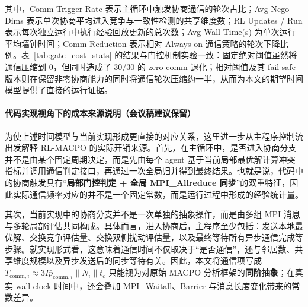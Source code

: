 \documentclass[12pt]{ctexart}
\begin{document}
\begin{table}[htbp]
  \centering
  \caption{Measured Cost Statistics for the Gate Mechanism Study (F1/F2/F5, 10 runs per function)}
  \label{tab:gate_cost_stats}
  \end{table}

  其中，Comm Trigger Rate 表示主循环中触发协商通信的轮次占比；Avg Nego Dims 表示单次协商平均进入竞争与一致性检测的共享维度数；RL Updates / Run 表示每次独立运行中执行经验回放更新的总次数；Avg Wall Time(s) 为单次运行平均墙钟时间；Comm Reduction 表示相对 Always-on 通信策略的轮次下降比例。表~\ref{tab:gate_cost_stats} 的结果与门控机制实验一致：固定绝对阈值虽然将通信压缩到 0，但同时造成了 \(30/30\) 的 zero-comm 退化；相对阈值及其 fail-safe 版本则在保留非零协商能力的同时将通信轮次压缩约一半，从而为本文的期望时间模型提供了直接的运行证据。


\paragraph{代码实现视角下的成本来源说明（会议稿建议保留）}
为使上述时间模型与当前实现形成更直接的对应关系，这里进一步从主程序控制流出发解释 RL-MACPO 的实际开销来源。首先，在主循环中，是否进入协商分支并不是由某个固定周期决定，而是先由每个 agent 基于当前局部最优解计算冲突指标并调用通信判定接口，再通过一次全局归并得到最终结果。也就是说，代码中的协商触发具有“\textbf{局部门控判定 + 全局 MPI\_Allreduce 同步}”的双重特征，因此实际通信频率对应的并不是一个固定常数，而是运行过程中形成的经验统计量。

其次，当前实现中的协商分支并不是一次单独的抽象操作，而是由多组 MPI 消息与多轮局部评估共同构成。具体而言，进入协商后，主程序至少包括：发送本地最优解、交换竞争评估量、交换双侧扰动评估量，以及最终等待所有异步通信完成等步骤。就实现形式看，这意味着通信时间不仅取决于“是否通信”，还与邻居数、共享维度规模以及异步发送后的同步等待有关。因此，本文将通信项写成 $T_{\mathrm{comm},i}\approx 3I\bar p_{\mathrm{comm},i}\lVert N_i\rVert t_c$ 只能视为对原始 MACPO 分析框架的\textbf{同阶抽象}；在真实 wall-clock 时间中，还会叠加 MPI\_Waitall、Barrier 与消息长度变化带来的常数差异。
\end{document}

